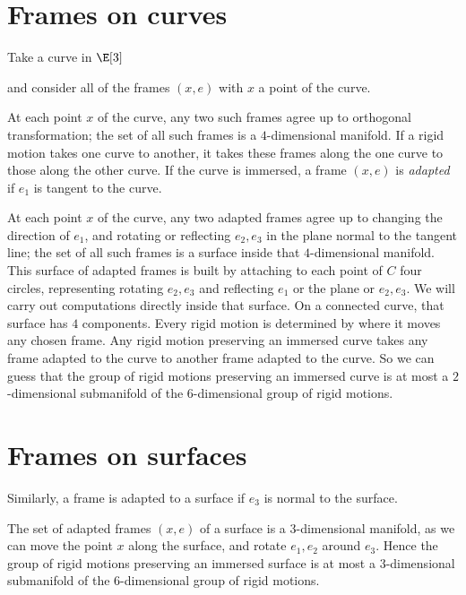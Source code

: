 \section{Frames on curves}
Take a curve in \(\E[3]\)
\begin{center}

\end{center}
and consider all of the frames \((x,e)\) with \(x\) a point of the curve.
\begin{center}

\end{center}
At each point \(x\) of the curve, any two such frames agree up to orthogonal transformation; the set of all such frames is a \(4\)-dimensional manifold.
If a rigid motion takes one curve to another, it takes these frames along the one curve to those along the other curve.
If the curve is immersed, a frame \((x,e)\) is \emph{adapted} if \(e_1\) is tangent to the curve.
\begin{center}

\end{center}
At each point \(x\) of the curve, any two adapted frames agree up to changing the direction of \(e_1\), and rotating or reflecting \(e_2,e_3\) in the plane normal to the tangent line; the set of all such frames is a surface inside that \(4\)-dimensional manifold.
This surface of adapted frames is built by attaching to each point of \(C\) four circles, representing rotating \(e_2,e_3\)  and reflecting \(e_1\) or the plane or \(e_2,e_3\).
We will carry out computations directly inside that surface.
On a connected curve, that surface has \(4\) components.
Every rigid motion is determined by where it moves any chosen frame.
Any rigid motion preserving an immersed curve takes any frame adapted to the curve to another frame adapted to the curve.
So we can guess that the group of rigid motions preserving an immersed curve is at most a \(2\)-dimensional submanifold of the \(6\)-dimensional group of rigid motions.

\section{Frames on surfaces}
Similarly, a frame is adapted to a surface if \(e_3\) is normal to the surface.
\begin{center}

\end{center}
The set of adapted frames \((x,e)\) of a surface is a \(3\)-dimensional manifold, as we can move the point \(x\) along the surface, and rotate \(e_1,e_2\) around \(e_3\).
Hence the group of rigid motions preserving an immersed surface is at most a \(3\)-dimensional submanifold of the \(6\)-dimensional group of rigid motions.

